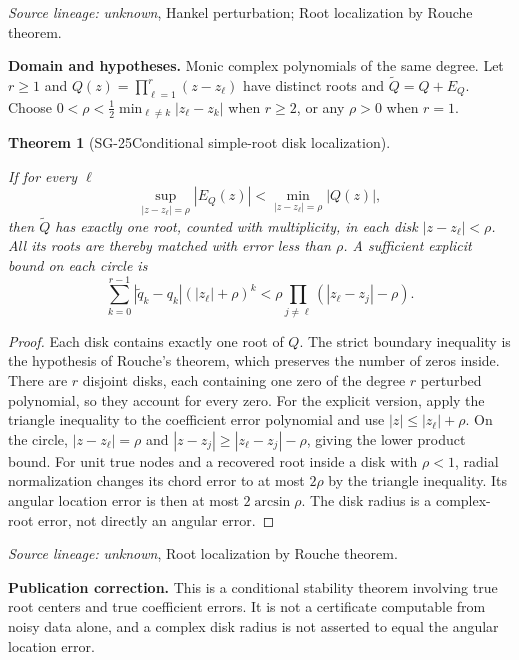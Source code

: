 \documentclass[11pt]{article}
\newtheorem{theorem}{Theorem}[section]
\theoremstyle{definition}\newtheorem{definition}[theorem]{Definition}
\theoremstyle{remark}\newtheorem{remark}[theorem]{Remark}
\begin{document}
\par{\small\color{Teal}\textit{Source lineage:} \textit{unknown}, Hankel perturbation; Root localization by Rouche theorem.}\par

\par{\small\textbf{Domain and hypotheses.} Monic complex polynomials of the same degree. Let $r\ge1$ and $Q(z)=\prod_{\ell=1}^r(z-z_\ell)$ have distinct roots and $\widetilde Q=Q+E_Q$. Choose $0<\rho<\tfrac12\min_{\ell\ne k}|z_\ell-z_k|$ when $r\ge2$, or any $\rho>0$ when $r=1$.}\par
\begin{theorem}[SG-25\quad Conditional simple-root disk localization]\label{SG-25}

If for every $\ell$
\[
 \sup_{|z-z_\ell|=\rho}|E_Q(z)|
 <\min_{|z-z_\ell|=\rho}|Q(z)|,
\]
then $\widetilde Q$ has exactly one root, counted with multiplicity, in each
disk $|z-z_\ell|<\rho$. All its roots are thereby matched with error less
than $\rho$. A sufficient explicit bound on each circle is
\[
 \sum_{k=0}^{r-1}|\widetilde q_k-q_k|(|z_\ell|+\rho)^k
 <\rho\prod_{j\ne\ell}(|z_\ell-z_j|-\rho).
\]

\end{theorem}
\begin{proof}

Each disk contains exactly one root of $Q$. The strict boundary inequality
is the hypothesis of Rouche's theorem, which preserves the number of zeros
inside. There are $r$ disjoint disks, each containing one zero of the degree
$r$ perturbed polynomial, so they account for every zero.
For the explicit version, apply the triangle inequality to the coefficient
error polynomial and use $|z|\le|z_\ell|+\rho$. On the circle,
$|z-z_\ell|=\rho$ and
$|z-z_j|\ge|z_\ell-z_j|-\rho$, giving the lower product bound.
For unit true nodes and a recovered root inside a disk with $\rho<1$, radial
normalization changes its chord error to at most $2\rho$ by the triangle
inequality. Its angular location error is then at most $2\arcsin\rho$.
The disk radius is a complex-root error, not directly an angular error.

\end{proof}

\par{\small\color{Teal}\textit{Source lineage:} \textit{unknown}, Root localization by Rouche theorem.}\par

\par{\small\textbf{Publication correction.} This is a conditional stability theorem involving true root centers and true coefficient errors. It is not a certificate computable from noisy data alone, and a complex disk radius is not asserted to equal the angular location error.}\par
\end{document}
